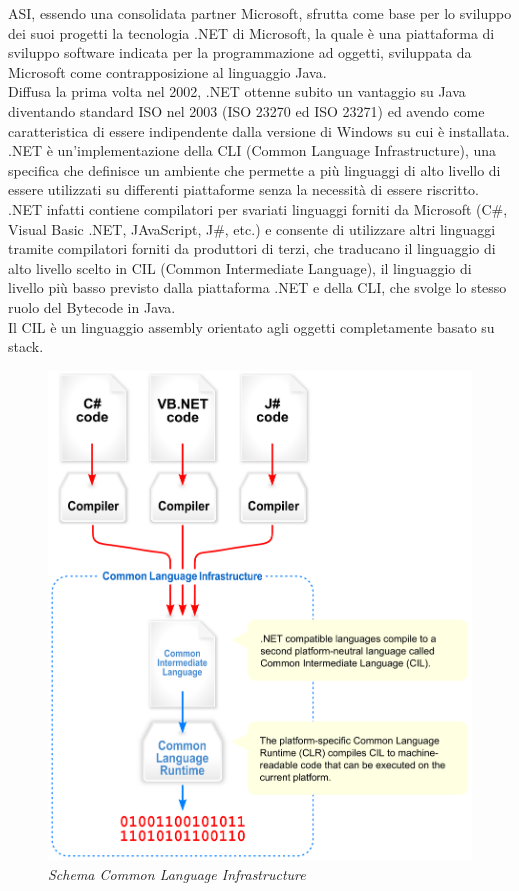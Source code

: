 ASI, essendo una consolidata partner Microsoft, sfrutta come base per lo sviluppo dei suoi progetti la tecnologia .NET di Microsoft, la quale è una piattaforma di sviluppo software indicata per la programmazione ad oggetti, sviluppata da Microsoft come contrapposizione al linguaggio Java.
\\
Diffusa la prima volta nel 2002, .NET ottenne subito un vantaggio su Java diventando standard ISO nel 2003 (ISO 23270 ed ISO 23271) ed avendo come caratteristica di essere indipendente dalla versione di Windows su cui è installata.
\\
.NET è un'implementazione della CLI (Common Language Infrastructure), una specifica che definisce un ambiente che permette a più linguaggi di alto livello di essere utilizzati su differenti piattaforme senza la necessità di essere riscritto.
\\
.NET infatti contiene compilatori per svariati linguaggi forniti da Microsoft (C\#, Visual Basic .NET, JAvaScript, J\#, etc.) e consente di utilizzare altri linguaggi tramite compilatori forniti da produttori di terzi, che traducano il linguaggio di alto livello scelto in CIL (Common Intermediate Language), il linguaggio di livello più basso previsto dalla piattaforma .NET e della CLI, che svolge lo stesso ruolo del Bytecode in Java.
\\
Il CIL è un linguaggio assembly orientato agli oggetti completamente basato su stack.

\begin{figure}[ht]
	\centering
	\includegraphics[scale=0.12]{immagini/processo/CIL.png}
	\caption{\textit{Schema Common Language Infrastructure}}
\end{figure}\FloatBarrier

